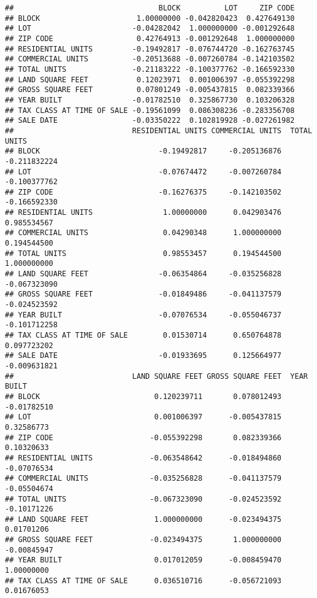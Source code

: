 \documentclass[
]{article}
\begin{document}
\begin{verbatim}
##                                 BLOCK          LOT     ZIP CODE
## BLOCK                      1.00000000 -0.042820423  0.427649130
## LOT                       -0.04282042  1.000000000 -0.001292648
## ZIP CODE                   0.42764913 -0.001292648  1.000000000
## RESIDENTIAL UNITS         -0.19492817 -0.076744720 -0.162763745
## COMMERCIAL UNITS          -0.20513688 -0.007260784 -0.142103502
## TOTAL UNITS               -0.21183222 -0.100377762 -0.166592330
## LAND SQUARE FEET           0.12023971  0.001006397 -0.055392298
## GROSS SQUARE FEET          0.07801249 -0.005437815  0.082339366
## YEAR BUILT                -0.01782510  0.325867730  0.103206328
## TAX CLASS AT TIME OF SALE -0.19561099  0.086308236 -0.283356708
## SALE DATE                 -0.03350222  0.102819928 -0.027261982
##                           RESIDENTIAL UNITS COMMERCIAL UNITS  TOTAL UNITS
## BLOCK                           -0.19492817     -0.205136876 -0.211832224
## LOT                             -0.07674472     -0.007260784 -0.100377762
## ZIP CODE                        -0.16276375     -0.142103502 -0.166592330
## RESIDENTIAL UNITS                1.00000000      0.042903476  0.985534567
## COMMERCIAL UNITS                 0.04290348      1.000000000  0.194544500
## TOTAL UNITS                      0.98553457      0.194544500  1.000000000
## LAND SQUARE FEET                -0.06354864     -0.035256828 -0.067323090
## GROSS SQUARE FEET               -0.01849486     -0.041137579 -0.024523592
## YEAR BUILT                      -0.07076534     -0.055046737 -0.101712258
## TAX CLASS AT TIME OF SALE        0.01530714      0.650764878  0.097723202
## SALE DATE                       -0.01933695      0.125664977 -0.009631821
##                           LAND SQUARE FEET GROSS SQUARE FEET  YEAR BUILT
## BLOCK                          0.120239711       0.078012493 -0.01782510
## LOT                            0.001006397      -0.005437815  0.32586773
## ZIP CODE                      -0.055392298       0.082339366  0.10320633
## RESIDENTIAL UNITS             -0.063548642      -0.018494860 -0.07076534
## COMMERCIAL UNITS              -0.035256828      -0.041137579 -0.05504674
## TOTAL UNITS                   -0.067323090      -0.024523592 -0.10171226
## LAND SQUARE FEET               1.000000000      -0.023494375  0.01701206
## GROSS SQUARE FEET             -0.023494375       1.000000000 -0.00845947
## YEAR BUILT                     0.017012059      -0.008459470  1.00000000
## TAX CLASS AT TIME OF SALE      0.036510716      -0.056721093  0.01676053

\end{verbatim}
\end{document}
